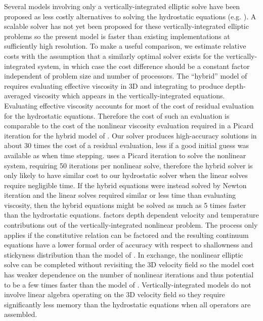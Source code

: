 \documentclass[final]{siamltex}
\begin{document}
Several models involving only a vertically-integrated elliptic solve have been proposed as less costly alternatives to solving the hydrostatic equations (e.g. \cite{bueler2009shallow,goldberg2009grounding,goldberg2010variational}).
A scalable solver has not yet been proposed for these vertically-integrated elliptic problems so the present model is faster than existing implementations at sufficiently high resolution.
To make a useful comparison, we estimate relative costs with the assumption that a similarly optimal solver exists for the vertically-integrated system, in which case the cost difference should be a constant factor independent of problem size and number of processors.
The ``hybrid'' model of \cite{goldberg2010variational} requires evaluating effective viscosity in 3D and integrating to produce depth-averaged viscosity which appears in the vertically-integrated equations.
Evaluating effective viscosity accounts for most of the cost of residual evaluation for the hydrostatic equations.
Therefore the cost of such an evaluation is comparable to the cost of the nonlinear viscosity evaluation required in a Picard iteration for the hybrid model of \cite{goldberg2010variational}.
Our solver produces high-accuracy solutions in about 30 times the cost of a residual evaluation, less if a good initial guess was available as when time stepping.
\cite{goldberg2010variational} uses a Picard iteration to solve the nonlinear system, requiring 50 iterations per nonlinear solve, therefore the hybrid solver is only likely to have similar cost to our hydrostatic solver when the linear solves require negligible time.
If the hybrid equations were instead solved by Newton iteration and the linear solves required similar or less time than evaluating viscosity, then the hybrid equations might be solved as much as 5 times faster than the hydrostatic equations.
\cite{bueler2009shallow} factors depth dependent velocity and temperature contributions out of the vertically-integrated nonlinear problem.
The process only applies if the constitutive relation can be factored and the resulting continuum equations have a lower formal order of accuracy with respect to shallowness and stickyness distribution than the model of \cite{goldberg2010variational}.
In exchange, the nonlinear elliptic solve can be completed without revisiting the 3D velocity field so the model cost has weaker dependence on the number of nonlinear iterations and thus potential to be a few times faster than the model of \cite{goldberg2010variational}.
Vertically-integrated models do not involve linear algebra operating on the 3D velocity field so they require significantly less memory than the hydrostatic equations when all operators are assembled.
\end{document}
